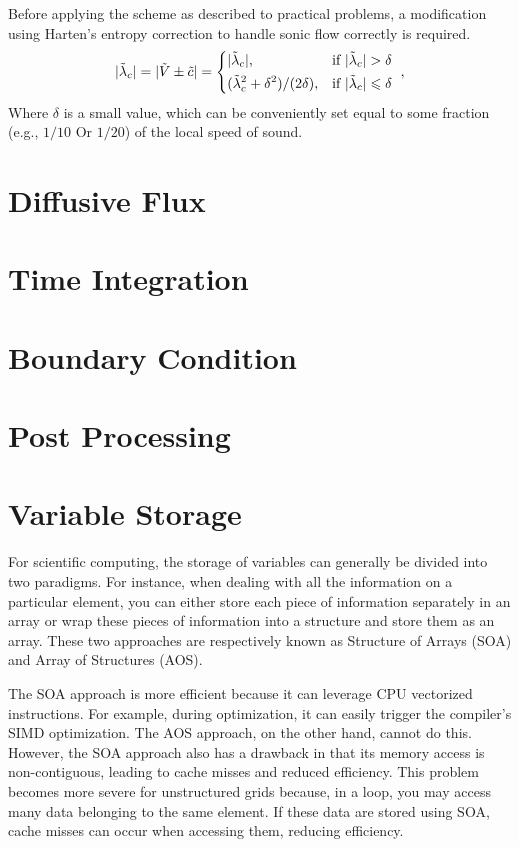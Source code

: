 \documentclass{develop-note}
\begin{document}
Before applying the scheme as described to practical problems, a modification using Harten's entropy correction to handle sonic flow correctly is required.
\begin{equation}
  |\tilde{\lambda}_{c}|=|\tilde{V}\pm\tilde{c}|=\begin{dcases*}
    |\tilde{\lambda}_{c}|, & if $|\tilde{\lambda}_{c}|>\delta$\\
    (\tilde{\lambda}_{c}^{2}+\delta^{2})/(2\delta), & if $|\tilde{\lambda}_{c}|\leqslant\delta$
  \end{dcases*},
\end{equation}
Where $\delta$ is a small value, which can be conveniently set equal to some fraction (e.g., $1/10$ Or $1/20$) of the local speed of sound.

\section{Diffusive Flux}


\section{Time Integration}


\section{Boundary Condition}


\section{Post Processing}


\section{Variable Storage}


For scientific computing, the storage of variables can generally be divided into two paradigms. For instance, when dealing with all the information on a particular element, you can either store each piece of information separately in an array or wrap these pieces of information into a structure and store them as an array. These two approaches are respectively known as Structure of Arrays (SOA) and Array of Structures (AOS).

The SOA approach is more efficient because it can leverage CPU vectorized instructions. For example, during optimization, it can easily trigger the compiler's SIMD optimization. The AOS approach, on the other hand, cannot do this. However, the SOA approach also has a drawback in that its memory access is non-contiguous, leading to cache misses and reduced efficiency. This problem becomes more severe for unstructured grids because, in a loop, you may access many data belonging to the same element. If these data are stored using SOA, cache misses can occur when accessing them, reducing efficiency.
\end{document}
